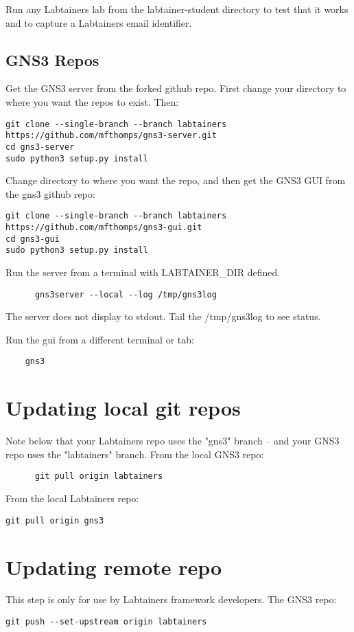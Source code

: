\documentclass[12pt]{article}
\begin{document}
\vspace{5mm}

\noindent
Run any Labtainers lab from the labtainer-student directory to test that it works and to capture a Labtainers email identifier.

\subsection{GNS3 Repos}
Get the GNS3 server from the forked github repo.  First change your directory to where you want the repos to
exist.  Then:
\small
\begin{verbatim}
git clone --single-branch --branch labtainers https://github.com/mfthomps/gns3-server.git
cd gns3-server
sudo python3 setup.py install
\end{verbatim}

Change directory to where you want the repo, and then get the GNS3 GUI from the gns3 github repo:
\small
\begin{verbatim}
git clone --single-branch --branch labtainers  https://github.com/mfthomps/gns3-gui.git
cd gns3-gui
sudo python3 setup.py install
\end{verbatim}
\normalsize
\noindent Run the server from a terminal with LABTAINER\_DIR defined.

\begin{verbatim}
      gns3server --local --log /tmp/gns3log
\end{verbatim}
\noindent The server does not display to stdout.  Tail the /tmp/gns3log to see status.

\noindent Run the gui from a different terminal or tab:
\begin{verbatim}
    gns3
\end{verbatim}

\section{Updating local git repos}
Note below that your Labtainers repo uses the "gns3" branch -- and your GNS3 repo uses the "labtainers" branch.
From the local GNS3  repo:
\begin{verbatim}
      git pull origin labtainers
\end{verbatim}

From the local Labtainers repo:
\begin{verbatim}
git pull origin gns3
\end{verbatim}

\section{Updating remote repo}
This step is only for use by Labtainers framework developers.
The GNS3 repo:
\begin{verbatim}
git push --set-upstream origin labtainers
\end{verbatim}
\end{document}
